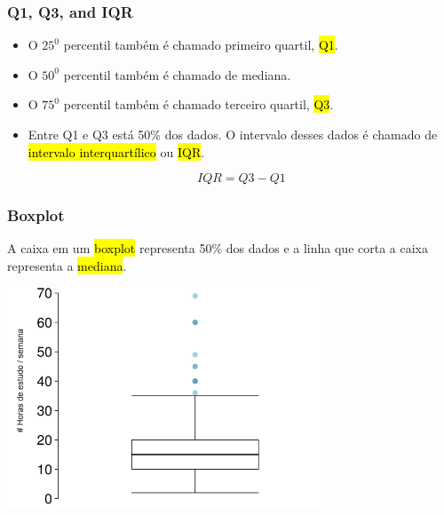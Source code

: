 
\begin{frame}[fragile]
\frametitle{Q1, Q3, and IQR}

\begin{itemize}
\justifying
\item O $25^{0}$ percentil também é chamado  primeiro quartil, \hl{Q1}.
\justifying
\item O $50^{0}$ percentil também é chamado de mediana.
\justifying
\item O $75^{0}$ percentil também é chamado terceiro quartil, \hl{Q3}.
\justifying
\item Entre Q1 e Q3 está 50\% dos dados. O intervalo desses dados é chamado de \hl{intervalo interquartílico} ou \hl{IQR}.

$$
IQR = Q3 - Q1 
$$

\end{itemize}

\end{frame}


\begin{frame}
\frametitle{Boxplot}
\justifying
A caixa em um \hl{boxplot} representa 50\% dos dados e a linha que corta a caixa representa a \hl{mediana}.

\begin{center}
\includegraphics[width=0.7\textwidth]{1-6_numerical_data/study_hours_box.png}
\end{center}

\end{frame}


